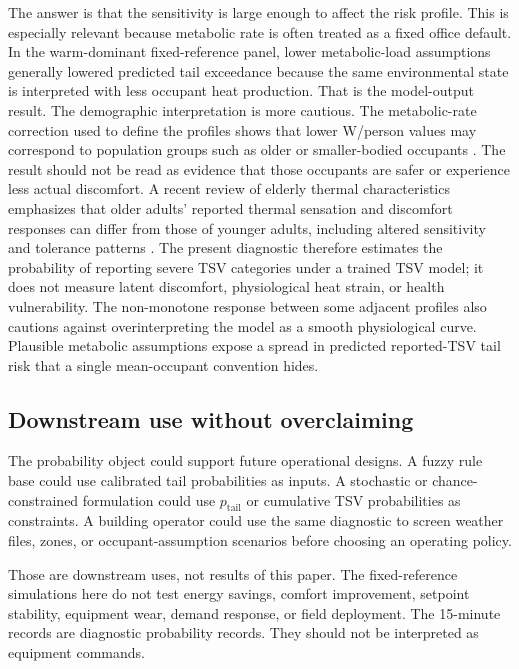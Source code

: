 The answer is that the sensitivity is large enough to affect the risk profile. This is especially relevant because metabolic rate is often treated as a fixed office default. In the warm-dominant fixed-reference panel, lower metabolic-load assumptions generally lowered predicted tail exceedance because the same environmental state is interpreted with less occupant heat production. That is the model-output result. The demographic interpretation is more cautious. The metabolic-rate correction used to define the profiles shows that lower W/person values may correspond to population groups such as older or smaller-bodied occupants \citep{Guo2025Correcting120W}. The result should not be read as evidence that those occupants are safer or experience less actual discomfort. A recent review of elderly thermal characteristics emphasizes that older adults' reported thermal sensation and discomfort responses can differ from those of younger adults, including altered sensitivity and tolerance patterns \citep{Xu2025ElderlyThermalReview}. The present diagnostic therefore estimates the probability of reporting severe TSV categories under a trained TSV model; it does not measure latent discomfort, physiological heat strain, or health vulnerability. The non-monotone response between some adjacent profiles also cautions against overinterpreting the model as a smooth physiological curve. Plausible metabolic assumptions expose a spread in predicted reported-TSV tail risk that a single mean-occupant convention hides.

\subsection{Downstream use without overclaiming}

The probability object could support future operational designs. A fuzzy rule base could use calibrated tail probabilities as inputs. A stochastic or chance-constrained formulation could use $p_{\mathrm{tail}}$ or cumulative TSV probabilities as constraints. A building operator could use the same diagnostic to screen weather files, zones, or occupant-assumption scenarios before choosing an operating policy.

Those are downstream uses, not results of this paper. The fixed-reference simulations here do not test energy savings, comfort improvement, setpoint stability, equipment wear, demand response, or field deployment. The 15-minute records are diagnostic probability records. They should not be interpreted as equipment commands.

